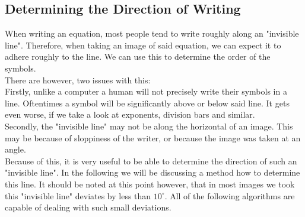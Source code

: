 \documentclass[12pt]{article}
\begin{document}
\begin{itemize}
\begin{itemize}
\begin{itemize}
\begin{itemize}
\begin{itemize}
\begin{itemize}
\begin{itemize}
\begin{itemize}
\begin{itemize}
\begin{itemize}
	\subsection{Determining the Direction of Writing}
	When writing an equation, most people tend to write roughly along an "invisible line".
	Therefore, when taking an image of said equation, we can expect it to adhere roughly to the line.
	We can use this to determine the order of the symbols.\\
	There are however, two issues with this:\\
	Firstly, unlike a computer a human will not precisely write their symbols in a line.
	Oftentimes a symbol will be significantly above or below said line.
	It gets even worse, if we take a look at exponents, division bars and similar.\\
	Secondly, the "invisible line" may not be along the horizontal of an image.
	This may be because of sloppiness of the writer, or because the image was taken at an angle.\\
	Because of this, it is very useful to be able to determine the direction of such an "invisible line".
	In the following we will be discussing a method how to determine this line.
	It should be noted at this point however, that in most images we took this "invisible line" deviates by less than $10^\circ$.
	All of the following algorithms are capable of dealing with such small deviations.\\
	
	
	
	
	

\end{itemize}
\end{itemize}
\end{itemize}
\end{itemize}
\end{itemize}
\end{itemize}
\end{itemize}
\end{itemize}
\end{itemize}
\end{itemize}
\end{document}
